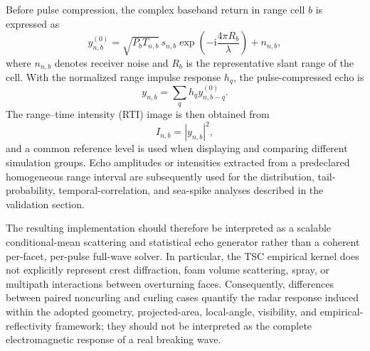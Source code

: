 Before pulse compression, the complex baseband return in range cell $b$ is expressed as
\begin{equation}
y_{n,b}^{(0)}
=
\sqrt{P_bT_{n,b}}\,
s_{n,b}
\exp
\left(
-\mathrm{i}\frac{4\pi R_b}{\lambda}
\right)
+
n_{n,b},
\label{eq:resolution_cell_complex_echo}
\end{equation}
where $n_{n,b}$ denotes receiver noise and $R_b$ is the representative slant range of the cell. With the normalized range impulse response $h_q$, the pulse-compressed echo is
\begin{equation}
y_{n,b}
=
\sum_q
h_q
y_{n,b-q}^{(0)}.
\label{eq:pulse_compressed_echo}
\end{equation}
The range--time intensity (RTI) image is then obtained from
\begin{equation}
I_{n,b}=|y_{n,b}|^2,
\end{equation}
and a common reference level is used when displaying and comparing different simulation groups. Echo amplitudes or intensities extracted from a predeclared homogeneous range interval are subsequently used for the distribution, tail-probability, temporal-correlation, and sea-spike analyses described in the validation section.

The resulting implementation should therefore be interpreted as a scalable conditional-mean scattering and statistical echo generator rather than a coherent per-facet, per-pulse full-wave solver. In particular, the TSC empirical kernel does not explicitly represent crest diffraction, foam volume scattering, spray, or multipath interactions between overturning faces. Consequently, differences between paired noncurling and curling cases quantify the radar response induced within the adopted geometry, projected-area, local-angle, visibility, and empirical-reflectivity framework; they should not be interpreted as the complete electromagnetic response of a real breaking wave.
